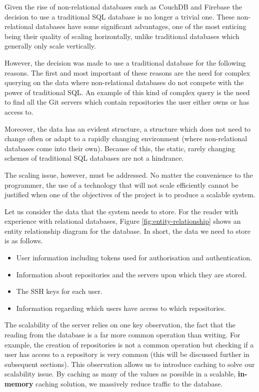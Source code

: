 Given the rise of non-relational databases such as CouchDB and Firebase the decision to use a traditional SQL database is no longer a trivial one. These non-relational databases have some significant advantages, one of the most enticing being their quality of scaling horizontally, unlike traditional databases which generally only scale vertically. 

However, the decision was made to use a traditional database for the following reasons. The first and most important of these reasons are the need for complex querying on the data where non-relational databases do not compete with the power of traditional SQL. An example of this kind of complex query is the need to find all the Git servers which contain repositories the user either owns or has access to.

Moreover, the data has an evident structure, a structure which does not need to change often or adapt to a rapidly changing environment (where non-relational databases come into their own). Because of this, the static, rarely changing schemes of traditional SQL databases are not a hindrance. 

The scaling issue, however, must be addressed. No matter the convenience to the programmer, the use of a technology that will not scale efficiently cannot be justified when one of the objectives of the project is to produce a scalable system. 

Let us consider the data that the system needs to store. For the reader with experience with relational databases, Figure \ref{fig:entity-relationship} shows an entity relationship diagram for the database. In short, the data we need to store is as follows.

\begin{itemize}
\item User information including tokens used for authorisation and authentication.
\item Information about repositories and the servers upon which they are stored.
\item The SSH keys for each user.
\item Information regarding which users have access to which repositories.
\end{itemize}


The scalability of the server relies on one key observation, the fact that the reading from the database is a far more common operation than writing. For example, the creation of repositories is not a common operation but checking if a user has access to a repository is very common (this will be discussed further in subsequent sections). This observation allows us to introduce caching to solve our scalability issue. By caching as many of the values as possible in a scalable, \textbf{in-memory} caching solution, we massively reduce traffic to the database. 

